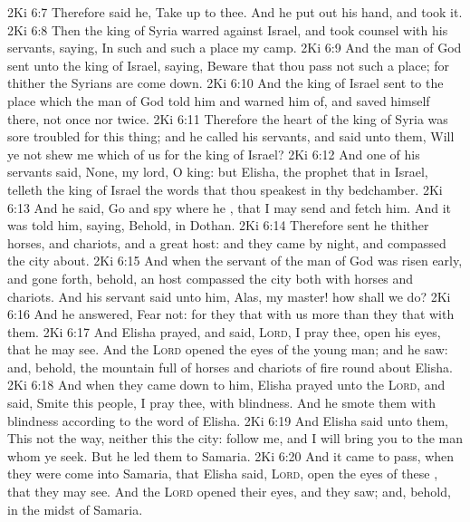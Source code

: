 \vs 2Ki 6:7 Therefore said he, Take  up to thee. And he put out his hand, and took it.
\vs 2Ki 6:8 Then the king of Syria warred against Israel, and took counsel with his servants, saying, In such and such a place  my camp.
\vs 2Ki 6:9 And the man of God sent unto the king of Israel, saying, Beware that thou pass not such a place; for thither the Syrians are come down.
\vs 2Ki 6:10 And the king of Israel sent to the place which the man of God told him and warned him of, and saved himself there, not once nor twice.
\vs 2Ki 6:11 Therefore the heart of the king of Syria was sore troubled for this thing; and he called his servants, and said unto them, Will ye not shew me which of us  for the king of Israel?
\vs 2Ki 6:12 And one of his servants said, None, my lord, O king: but Elisha, the prophet that  in Israel, telleth the king of Israel the words that thou speakest in thy bedchamber.
\vs 2Ki 6:13 And he said, Go and spy where he , that I may send and fetch him. And it was told him, saying, Behold,  in Dothan.
\vs 2Ki 6:14 Therefore sent he thither horses, and chariots, and a great host: and they came by night, and compassed the city about.
\vs 2Ki 6:15 And when the servant of the man of God was risen early, and gone forth, behold, an host compassed the city both with horses and chariots. And his servant said unto him, Alas, my master! how shall we do?
\vs 2Ki 6:16 And he answered, Fear not: for they that  with us  more than they that  with them.
\vs 2Ki 6:17 And Elisha prayed, and said, \textsc{Lord}, I pray thee, open his eyes, that he may see. And the \textsc{Lord} opened the eyes of the young man; and he saw: and, behold, the mountain  full of horses and chariots of fire round about Elisha.
\vs 2Ki 6:18 And when they came down to him, Elisha prayed unto the \textsc{Lord}, and said, Smite this people, I pray thee, with blindness. And he smote them with blindness according to the word of Elisha.
\vs 2Ki 6:19 And Elisha said unto them, This  not the way, neither  this the city: follow me, and I will bring you to the man whom ye seek. But he led them to Samaria.
\vs 2Ki 6:20 And it came to pass, when they were come into Samaria, that Elisha said, \textsc{Lord}, open the eyes of these , that they may see. And the \textsc{Lord} opened their eyes, and they saw; and, behold,  in the midst of Samaria.
